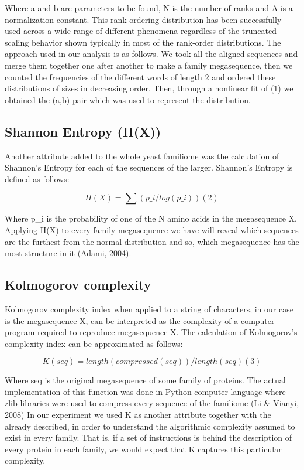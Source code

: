\documentclass[preprint,12pt]{elsarticle}
\begin{document}
Where a and b are parameters to be found, N is the number of ranks and A is a normalization constant. This rank ordering distribution has been successfully used across a wide range of different phenomena regardless of the truncated scaling behavior shown typically in most of the rank-order distributions.
The approach used in our analysis is as follows. We took all the aligned sequences and merge them together one after another to make a family megasequence, then we counted the frequencies of the different words of length 2 and ordered these distributions of sizes in decreasing order. Then, through a nonlinear fit of (1) we obtained the (a,b) pair which was used to represent the distribution. 

\subsection{Shannon Entropy (H(X))}
Another attribute added to the whole yeast familiome was the calculation of Shannon’s Entropy for each of the sequences of the larger. Shannon’s Entropy is defined as follows:

\[
H(X) = \sum(p\_i/log(p\_i))      (2)
\]

Where p\_i is the probability of one of the N amino acids in the megasequence X. Applying H(X) to every family megasequence we have will reveal which sequences are the furthest from the normal distribution and so, which megasequence has the most structure in it (Adami, 2004).

\subsection{Kolmogorov complexity}

Kolmogorov complexity index when applied to a string of characters, in our case is the megasequence X, can be interpreted as the complexity of a computer program required to reproduce megasequence X. The calculation of Kolmogorov’s complexity index can be approximated as follows:

\[
K(seq) =  length(compressed(seq)) /  length(seq)	(3)
\]

Where seq is the original megasequence of some family of proteins. The actual implementation of this function was done in Python computer language where zlib libraries were used to compress every sequence of the familiome (Li \& Vianyi, 2008) 
In our experiment we used K as another attribute together with the already described, in order to understand the algorithmic complexity assumed to exist in every family. That is, if a set of instructions is behind the description of every protein in each family, we would expect that K captures this particular complexity.
\end{document}
